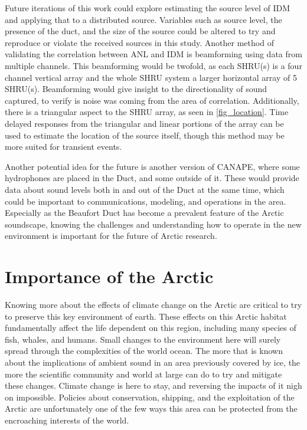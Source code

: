 Future iterations of this work could explore estimating the source level of IDM and applying that to a distributed source. Variables such as source level, the presence of the duct, and the size of the source could be altered to try and reproduce or violate the received sources in this study. Another method of validating the correlation between ANL and IDM is beamforming using data from multiple channels. This beamforming would be twofold, as each SHRU(s) is a four channel vertical array and the whole SHRU system a larger horizontal array of 5 SHRU(s). Beamforming would give insight to the directionality of sound captured, to verify is noise was coming from the area of correlation. Additionally, there is a triangular aspect to the SHRU array, as seen in \autoref{fig_location}. Time delayed responses from the triangular and linear portions of the array can be used to estimate the location of the source itself, though this method may be more suited for transient events.

Another potential idea for the future is another version of CANAPE, where some hydrophones are placed in the Duct, and some outside of it. These would provide data about sound levels both in and out of the Duct at the same time, which could be important to communications, modeling, and operations in the area. Especially as the Beaufort Duct has become a prevalent feature of the Arctic soundscape, knowing the challenges and understanding how to operate in the new environment is important for the future of Arctic research.


\section{Importance of the Arctic}

Knowing more about the effects of climate change on the Arctic are critical to try to preserve this key environment of earth. These effects on this Arctic habitat fundamentally affect the life dependent on this region, including many species of fish, whales, and humans. Small changes to the environment here will surely spread through the complexities of the world ocean. The more that is known about the implications of ambient sound in an area previously covered by ice, the more the scientific community and world at large can do to try and mitigate these changes. Climate change is here to stay, and reversing the impacts of it nigh on impossible. Policies about conservation, shipping, and the exploitation of the Arctic are unfortunately one of the few ways this area can be protected from the encroaching interests of the world.